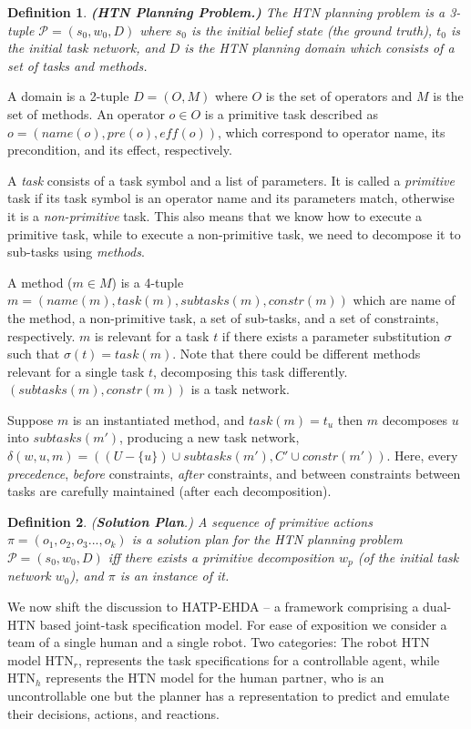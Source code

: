 \documentclass[letterpaper]{article} %
\newtheorem{definition}{Definition}
\begin{document}
\begin{definition}
\textbf{(HTN Planning Problem.)} 
The HTN planning
problem is a 3-tuple $\mathcal{P} = (s_0, w_0, D)$ where $s_0$ is the initial belief state (the ground truth), $t_0$ is the initial task network, and $D$ is the HTN planning domain which consists of a set of tasks and methods.
\end{definition}
A domain is a 2-tuple $D=(O, M)$ where $O$ is the set of operators and $M$ is the set of methods. An operator $o \in O$ is a primitive task described as $o=(name(o), pre(o), \textit{eff}(o))$, which correspond to operator name, its precondition, and its effect, respectively. 

A \textit{task} consists of a task symbol and a list of parameters. It is called a \textit{primitive} task if its task symbol is an operator name and its parameters match, otherwise it is a \textit{non-primitive} task. This also means that we know how to execute a primitive task, while to execute a non-primitive task, we need to decompose it to sub-tasks using \textit{methods}. 

A method ($m \in M$) is a 4-tuple $m=(name(m),task(m),subtasks(m),constr(m))$ which are name of the method, a non-primitive task, a set of sub-tasks, and a set of constraints, respectively. $m$ is relevant for a task $t$ if there exists a parameter substitution $\sigma$ such that $\sigma(t) = task(m)$. Note that there could be different methods relevant for a single task $t$, decomposing this task differently. $(subtasks(m),constr(m))$ is a task network.      

Suppose $m$ is an instantiated method, and $task(m)=t_u$ then $m$ decomposes $u$ into $subtasks(m')$, producing a new task network, $\delta(w,u,m)=((U-\{u\})\cup subtasks(m'),C'\cup constr(m'))$.
Here, every \textit{precedence}, \textit{before} constraints, \textit{after} constraints, and between constraints between tasks are carefully maintained (after each decomposition).

\begin{definition} 
(\textbf{Solution Plan}.) 
{A sequence of primitive actions $\pi=(o_1,o_2,o_3...,o_k)$ is a solution plan for the HTN planning problem $\mathcal{P}=(s_0,w_0,D)$ iff there exists a primitive decomposition $w_p$ (of the initial task network $w_0$), and $\pi$ is an instance of it. 
}  
\end{definition}

We now shift the discussion to HATP-EHDA -- a framework comprising a dual-HTN based joint-task specification model.   
For ease of exposition we consider a team of a single human and a single robot. Two categories: The robot HTN model $\mathrm{HTN}_{r}$, represents the task specifications for a controllable agent, while $\mathrm{HTN}_{h}$ represents the HTN model for the human partner, who is an uncontrollable one but the planner has a
representation to predict and emulate their decisions, actions, and reactions. 
\end{document}
